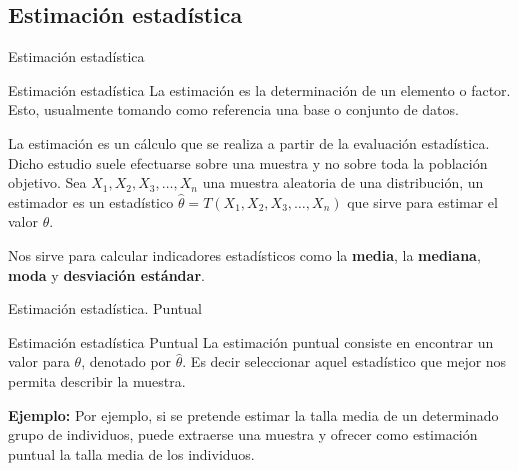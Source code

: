 \documentclass[11pt]{beamer}
\begin{document}
      \subsection{Estimación estadística}
        \begin{frame}{Estimación estadística}
            \begin{block}{Estimación estadística}
                La estimación es la determinación de un elemento o factor. Esto, usualmente tomando como referencia una base o conjunto de datos.
            \end{block}
            \pause
            La estimación es un cálculo que se realiza a partir de la evaluación estadística. Dicho estudio suele efectuarse sobre una muestra y no sobre toda la población objetivo.
            Sea $X_1, X_2, X_3, \ldots , X_n $ una muestra aleatoria de una distribución, un estimador es un estadístico $\hat{\theta}=T(X_1, X_2, X_3, \ldots , X_n)$ que sirve para estimar el valor $\theta$.

            \pause
            Nos sirve para calcular indicadores estadísticos como la \textbf{media}, la\textbf{ mediana}, \textbf{moda} y \textbf{desviación estándar}.
        \end{frame}

        \begin{frame}{Estimación estadística. Puntual}
            \begin{block}{Estimación estadística Puntual}
                La estimación puntual consiste en encontrar un valor para $\theta$, denotado por  $\hat {\theta }$. Es decir seleccionar aquel estadístico que mejor nos permita describir la muestra.

                \pause
                \textbf{Ejemplo:} Por ejemplo, si se pretende estimar la talla media de un determinado grupo de individuos, puede extraerse una muestra y ofrecer como estimación puntual la talla media de los individuos.
            \end{block}

        \end{frame}
\end{document}

